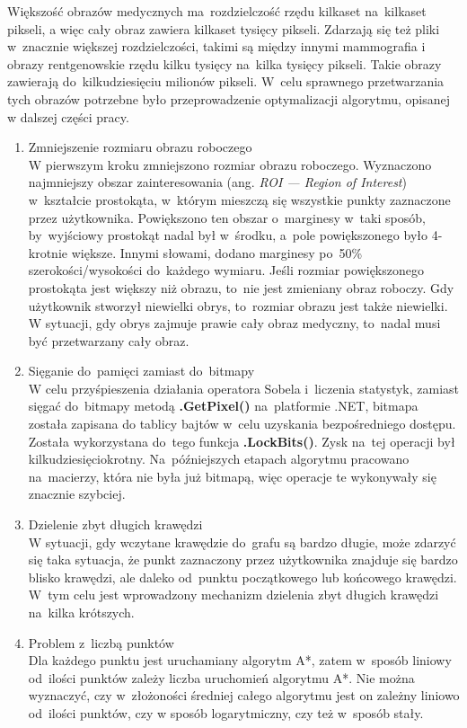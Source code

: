 \documentclass[a4paper,11pt,twoside,openright]{report}
\theoremstyle{definition}
\begin{document}
Większość obrazów medycznych ma~rozdzielczość rzędu kilkaset na~kilkaset pikseli,
a więc cały obraz zawiera kilkaset tysięcy pikseli. Zdarzają się też
pliki w~znacznie większej rozdzielczości, takimi są między innymi mammografia i
obrazy rentgenowskie rzędu kilku tysięcy na~kilka tysięcy pikseli.
Takie obrazy zawierają do~kilkudziesięciu milionów
pikseli. W~celu sprawnego przetwarzania tych obrazów potrzebne było przeprowadzenie optymalizacji
algorytmu, opisanej w dalszej części pracy.
\begin{enumerate}
\item Zmniejszenie rozmiaru obrazu roboczego \\
W pierwszym kroku zmniejszono rozmiar obrazu roboczego. Wyznaczono najmniejszy obszar
zainteresowania (ang. \textit{ROI --- Region of Interest}) w~kształcie
prostokąta, w~którym mieszczą się wszystkie punkty zaznaczone przez użytkownika.
Powiększono ten obszar o~marginesy w~taki sposób, by~wyjściowy prostokąt nadal
był w~środku, a~pole powiększonego było 4-krotnie większe. Innymi słowami,
dodano marginesy po~50\% szerokości/wysokości do~każdego wymiaru. Jeśli rozmiar
powiększonego prostokąta jest większy niż obrazu, to~nie jest zmieniany obraz roboczy.
Gdy użytkownik stworzył niewielki obrys, to~rozmiar obrazu jest także niewielki.
W sytuacji, gdy obrys zajmuje prawie cały obraz medyczny, to~nadal musi być
przetwarzany cały obraz.
\item Sięganie do~pamięci zamiast do~bitmapy \\
W celu przyśpieszenia działania operatora Sobela i~liczenia statystyk, zamiast
sięgać do~bitmapy metodą \textbf{.GetPixel()} na~platformie .NET, bitmapa została zapisana
do tablicy bajtów w~celu uzyskania bezpośredniego dostępu. Została wykorzystana do~tego
funkcja \textbf{.LockBits()}. Zysk na~tej operacji był kilkudziesięciokrotny. Na~późniejszych
etapach algorytmu pracowano na~macierzy, która nie była już bitmapą, więc operacje
te wykonywały się znacznie szybciej.
\item Dzielenie zbyt długich krawędzi \\
W sytuacji, gdy wczytane krawędzie do~grafu są bardzo długie, może zdarzyć się
taka sytuacja, że punkt zaznaczony przez użytkownika znajduje się bardzo blisko
krawędzi, ale daleko od~punktu początkowego lub końcowego krawędzi. W~tym celu
jest wprowadzony mechanizm dzielenia zbyt długich krawędzi na~kilka krótszych. \\
\item Problem z~liczbą punktów \\
Dla każdego punktu jest uruchamiany algorytm A*, zatem w~sposób liniowy od~ilości
punktów zależy liczba uruchomień algorytmu A*. Nie można wyznaczyć, czy w~złożoności
średniej całego algorytmu jest on zależny liniowo od~ilości punktów, czy
w sposób logarytmiczny, czy też w~sposób stały.
\end{enumerate}
\end{document}
